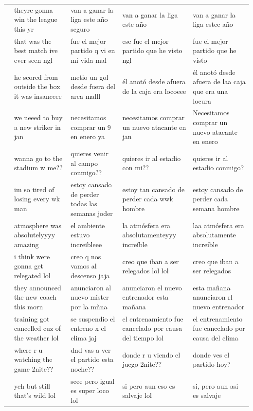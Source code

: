 \documentclass[11pt]{article}
\begin{document}
{\begin{longtable}{c p{3.3cm} p{3.3cm} p{3.3cm} p{3.3cm}}
  \addlinespace
  10 & theyre gonna win the league this yr & van a ganar la liga este año seguro & van a ganar la liga este año & van a ganar la liga estee año \\
  \addlinespace
  11 & that was the best match ive ever seen ngl & fue el mejor partido q vi en mi vida mal & ese fue el mejor partido que he visto ngl & fue el mejor partido que he visto \\
  \addlinespace
  12 & he scored from outside the box it was insaneeee & metio un gol desde fuera del area malll & él anotó desde afuera de la caja era locoeee & él anotó desde afuera de laa caja que era una locura \\
  \addlinespace
  13 & we neeed to buy a new striker in jan & necesitamos comprar un 9 en enero ya & necesitamos comprar un nuevo atacante en jan & Necesitamos comprar un nuevo atacante en enero \\
  \addlinespace
  14 & wanna go to the stadium w me?? & quieres venir al campo conmigo?? & quieres ir al estadio con mi?? & quieres ir al estadio conmigo? \\
  \addlinespace
  15 & im so tired of losing every wk man & estoy cansado de perder todas las semanas joder & estoy tan cansado de perder cada wwk hombre & estoy cansado de perder cada semana hombre \\
  \addlinespace
  16 & atmosphere was absolutelyyyy amazing & el ambiente estuvo increibleee & la atmósfera era absolutamenteyyy increíble & laa atmósfera era absolutamente increíble \\
  \addlinespace
  17 & i think were gonna get relegated lol & creo q nos vamos al descenso jaja & creo que iban a ser relegados lol lol & creo que iban a ser relegados \\
  \addlinespace
  18 & they announced the new coach this morn & anunciaron al nuevo mister por la mñna & anunciaron el nuevo entrenador esta mañana & esta mañana anunciaron rl nuevo entrenador \\
  \addlinespace
  19 & training got cancelled cuz of the weather lol & se suspendio el entreno x el clima jaj & el entrenamiento fue cancelado por causa del tiempo lol & el entrenamiento fue cancelado por causa del clima \\
  \addlinespace
  20 & where r u watching the game 2nite?? & dnd vas a ver el partido esta noche?? & donde r u viendo el juego 2nite?? & donde ves el partido hoy? \\
  \addlinespace
  21 & yeh but still that's wild lol & seee pero igual es super loco lol & si pero aun eso es salvaje lol & si, pero aun asi es salvaje \\

\end{longtable}}
\end{document}
